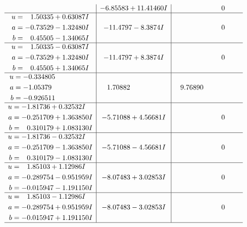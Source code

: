 \documentclass[1p]{elsarticle_modified}
\theoremstyle{definition}
\begin{document}
$$\begin{array}{c|c|c}
 & -6.85583 + 11.41460 I & \phantom{-0.000000 } 0 \\ \hline\begin{aligned}
u &= \phantom{-}1.50335 + 0.63087 I \\
a &= -0.73529 - 1.32480 I \\
b &= \phantom{-}0.45505 - 1.34065 I\end{aligned}
 & -11.4797 - 8.3874 I & \phantom{-0.000000 } 0 \\ \hline\begin{aligned}
u &= \phantom{-}1.50335 - 0.63087 I \\
a &= -0.73529 + 1.32480 I \\
b &= \phantom{-}0.45505 + 1.34065 I\end{aligned}
 & -11.4797 + 8.3874 I & \phantom{-0.000000 } 0 \\ \hline\begin{aligned}
u &= -0.334805\phantom{ +0.000000I} \\
a &= -1.05379\phantom{ +0.000000I} \\
b &= -0.926511\phantom{ +0.000000I}\end{aligned}
 & \phantom{-}1.70882\phantom{ +0.000000I} & \phantom{-}9.76890\phantom{ +0.000000I} \\ \hline\begin{aligned}
u &= -1.81736 + 0.32532 I \\
a &= -0.251709 + 1.363850 I \\
b &= \phantom{-}0.310179 + 1.083130 I\end{aligned}
 & -5.71088 + 4.56681 I & \phantom{-0.000000 } 0 \\ \hline\begin{aligned}
u &= -1.81736 - 0.32532 I \\
a &= -0.251709 - 1.363850 I \\
b &= \phantom{-}0.310179 - 1.083130 I\end{aligned}
 & -5.71088 - 4.56681 I & \phantom{-0.000000 } 0 \\ \hline\begin{aligned}
u &= \phantom{-}1.85103 + 1.12986 I \\
a &= -0.289754 - 0.951959 I \\
b &= -0.015947 - 1.191150 I\end{aligned}
 & -8.07483 + 3.02853 I & \phantom{-0.000000 } 0 \\ \hline\begin{aligned}
u &= \phantom{-}1.85103 - 1.12986 I \\
a &= -0.289754 + 0.951959 I \\
b &= -0.015947 + 1.191150 I\end{aligned}
 & -8.07483 - 3.02853 I & \phantom{-0.000000 } 0\\
 \hline 
 \end{array}$$\newpage\newpage\renewcommand{\arraystretch}{1}
\end{document}

